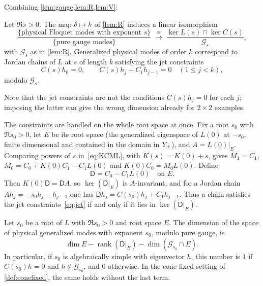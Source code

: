 Combining \cref{lem:gauge,lem:R,lem:V}:

\begin{theorem}[Correspondence]\label{thm:correspondence}
Let $\Re s>0$. The map $\delta\mapsto h$ of \cref{lem:R} induces a linear isomorphism
\[
  \frac{\{\text{physical Floquet modes with exponent }s\}}{\{\text{pure gauge modes}\}}
  \;\xrightarrow{\ \cong\ }\;
  \frac{\ker L(s)\cap\ker C(s)}{\mathcal G_s},
\]
with $\mathcal G_s$ as in \cref{lem:R}. Generalized physical modes of order $k$ correspond to Jordan chains of
$L$ at $s$ of length $k$ satisfying the jet constraints
\begin{equation}\label{eq:jet}
  C(s)h_0=0,\qquad C(s)h_j+C_1h_{j-1}=0\quad(1\le j<k),
\end{equation}
modulo $\mathcal G_s$.
\end{theorem}

Note that the jet constraints are not the conditions $C(s)h_j=0$ for each $j$; imposing the latter can
give the wrong dimension already for $2\times2$ examples.

The constraints are handled on the whole root space at once. Fix a root $s_0$ with $\Re s_0>0$, let $E$ be its
root space (the generalized eigenspace of $L(0)$ at $-s_0$, finite dimensional and contained in the domain in
$Y_{+}$), and $A=L(0)|_E$. Comparing powers of $s$ in~\eqref{eq:KCML}, with $K(s)=K(0)+s$, gives $M_1=C_1$,
$M_0=C_0+K(0)C_1-C_1L(0)$ and $K(0)C_0=M_0L(0)$. Define
\[
  \mathsf D=C_0-C_1L(0)\quad\text{on }E .
\]
Then $K(0)\mathsf D=\mathsf DA$, so $\ker(\mathsf D|_E)$ is $A$-invariant, and for a Jordan chain
$Ah_j=-s_0h_j-h_{j-1}$ one has $\mathsf Dh_j=C(s_0)h_j+C_1h_{j-1}$. Thus a chain satisfies the jet
constraints~\eqref{eq:jet} if and only if it lies in $\ker(\mathsf D|_E)$.

\begin{proposition}\label{prop:physmult}
Let $s_0$ be a root of $L$ with $\Re s_0>0$ and root space $E$. The dimension of the space of physical
generalized modes with exponent $s_0$, modulo pure gauge, is
\[
  \dim E-\operatorname{rank}(\mathsf D|_E)-\dim(\mathcal G_{s_0}\cap E).
\]
In particular, if $s_0$ is algebraically simple with eigenvector $h$, this number is $1$ if $C(s_0)h=0$ and
$h\notin\mathcal G_{s_0}$, and $0$ otherwise. In the cone-fixed setting of \cref{def:conefixed}, the same holds without the last
term.
\end{proposition}

